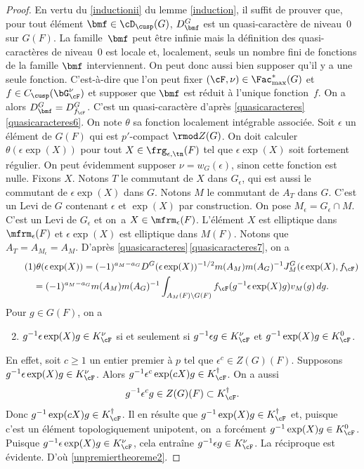 \begin{proof}
En vertu du \eqref{inductionii} du lemme \ref{induction}, il suffit de prouver que, pour tout élément $\bmf\in \cD_{\cusp}(G)$, $D^G_{\bmf}$ est un quasi-caractère de niveau~$0$ sur $G(F)$. La famille~$\bmf$ peut être infinie mais la définition des quasi-caractères de niveau~$0$ est locale et, loca\-lement, seuls un nombre fini de fonctions de la famille $\bmf$ interviennent. On peut donc aussi bien supposer qu'il y a une seule fonction. C'est-à-dire que l'on peut fixer $(\cF,\nu)\in \Fac^*_{\max}(G)$ et $f\in C_{\cusp}(\bG_{\cF}^{\nu})$ et supposer que $\bmf$ est réduit à l'unique fonction~$f$. On a alors $D^G_{\bmf}=D^G_{f_{\cF}}$. C'est un quasi-caractère d'après \ref{quasicaracteres}\,\eqref{quasicaracteres6}. On note $\theta$ sa fonction localement intégrable associée. Soit $\epsilon$ un élément de $G(F)$ qui est $p'$-compact $\rmod Z(G)$. On doit calculer $\theta(\epsilon \exp(X))$ pour tout $X\in \frg_{\epsilon,\tn}(F)$ tel que $\epsilon \exp(X)$ soit fortement régulier. On peut évidemment supposer $\nu=w_{G}(\epsilon)$, sinon cette fonction est nulle. Fixons $X$. Notons $T$ le commutant de $X$ dans $G_{\epsilon}$, qui est aussi le commutant de $\epsilon \exp(X)$ dans $G$. Notons $M$ le commutant de $A_{T}$ dans $G$. C'est un Levi de $G$ contenant $\epsilon$ et $\exp(X)$ par construction. On pose $M_{\epsilon}=G_{\epsilon}\cap M$. C'est un Levi de $G_{\epsilon}$ et on~a $X\in \mfrm_{\epsilon}(F)$. L'élément $X$ est elliptique dans $\mfrm_{\epsilon}(F)$ et $\epsilon \exp(X)$ est elliptique dans $M(F)$. Notons que $A_{T}=A_{M_{\epsilon}}=A_{M}$. D'après \ref{quasicaracteres}\,\eqref{quasicaracteres7}, on a
\begin{multline}\tag{1}\label{unpremiertheoreme1}
\theta(\epsilon \exp(X))=(-1)^{a_{M}-a_{G}}D^G(\epsilon \exp(X))^{-1/2}m(A_{M})m(A_{G})^{-1}J^G_{M}(\epsilon \exp(X),f_{\cF})
\\
=(-1)^{a_{M}-a_{G}}m(A_{M})m(A_{G})^{-1} \int_{A_{M}(F)\backslash G(F)}f_{\cF}(g^{-1} \epsilon \exp(X)g)v_{M}(g)\, dg.
\end{multline}
Pour $g\in G(F)$, on a
\begin{enumerate}\setcounter{enumi}{1}
\item\label{unpremiertheoreme2}
$g^{-1}\epsilon \exp(X)g\in K_{\cF}^{\nu}$ si et seulement si $g^{-1}\epsilon g\in K_{\cF}^{\nu}$ et $g^{-1} \exp(X)g\in K_{\cF}^0$.
\end{enumerate}

En effet, soit $c\geq1$ un entier premier à $p$ tel que $\epsilon^c\in Z(G)(F)$. Supposons $g^{-1}\epsilon \exp(X)g\in K_{\cF}^{\nu}$. Alors $g^{-1} \epsilon^c\exp(cX)g\in K_{\cF}^{\dag}$. On a aussi
\[
g^{-1}\epsilon^cg\in Z(G)(F)\subset K_{\cF}^{\dag}.
\]
Donc $g^{-1}\exp(cX)g\in K_{\cF}^{\dag}$. Il en résulte que $g^{-1}\exp(X)g\in K_{\cF}^{\dag}$ et, puisque c'est un élément topologiquement unipotent, on~a forcément $g^{-1}\exp(X)g\in K_{\cF}^0$. Puisque $g^{-1}\epsilon \exp(X)g\in K_{\cF}^{\nu}$, cela entraîne $g^{-1}\epsilon g\in K_{\cF}^{\nu}$. La réciproque est évidente. D'où \eqref{unpremiertheoreme2}.


\end{proof}
